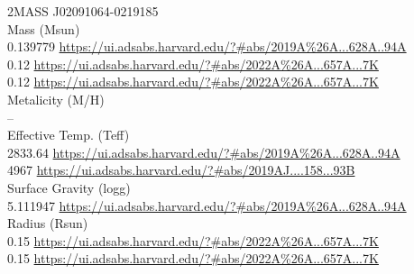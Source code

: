 2MASS J02091064-0219185 \\
Mass (Msun)\\
0.139779 \url{https://ui.adsabs.harvard.edu/?#abs/2019A%26A...628A..94A}\\
0.12 \url{https://ui.adsabs.harvard.edu/?#abs/2022A%26A...657A...7K}\\
0.12 \url{https://ui.adsabs.harvard.edu/?#abs/2022A%26A...657A...7K}\\
Metalicity (M/H)\\
--\\
Effective Temp. (Teff)\\
2833.64 \url{https://ui.adsabs.harvard.edu/?#abs/2019A%26A...628A..94A}\\
4967 \url{https://ui.adsabs.harvard.edu/?#abs/2019AJ....158...93B}\\
Surface Gravity (logg)\\
5.111947 \url{https://ui.adsabs.harvard.edu/?#abs/2019A%26A...628A..94A}\\
Radius (Rsun)\\
0.15 \url{https://ui.adsabs.harvard.edu/?#abs/2022A%26A...657A...7K}\\
0.15 \url{https://ui.adsabs.harvard.edu/?#abs/2022A%26A...657A...7K}\\